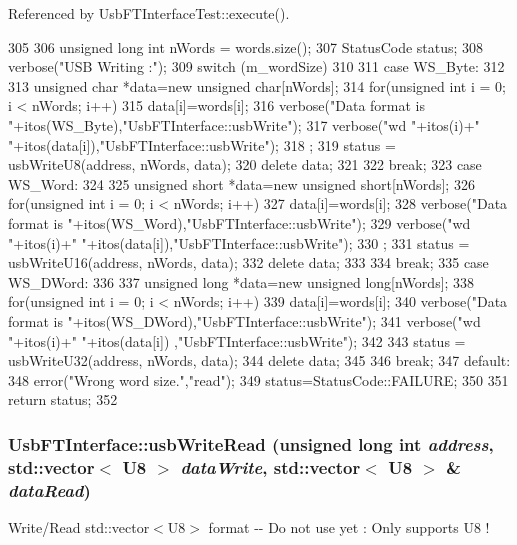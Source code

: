 Referenced by UsbFTInterfaceTest::execute().


\begin{DoxyCode}
305 {
306   unsigned long int nWords = words.size();
307   StatusCode status;
308   verbose("USB Writing :");
309   switch (m_wordSize)
310   {
311   case WS_Byte:
312     {
313       unsigned char *data=new unsigned char[nWords];
314       for(unsigned int i = 0; i < nWords; i++){
315         data[i]=words[i];
316         verbose("Data format is "+itos(WS_Byte),"UsbFTInterface::usbWrite");
317         verbose("wd "+itos(i)+" "+itos(data[i]),"UsbFTInterface::usbWrite");
318       };
319       status = usbWriteU8(address, nWords, data);
320       delete data;
321     }
322     break;
323   case WS_Word:
324     {
325       unsigned short *data=new unsigned short[nWords];
326       for(unsigned int i = 0; i < nWords; i++){
327         data[i]=words[i];
328         verbose("Data format is "+itos(WS_Word),"UsbFTInterface::usbWrite");
329         verbose("wd "+itos(i)+" "+itos(data[i]),"UsbFTInterface::usbWrite");
330       };
331       status = usbWriteU16(address, nWords, data);
332       delete data;
333     }
334     break;
335   case WS_DWord:
336     {
337       unsigned long *data=new unsigned long[nWords];
338       for(unsigned int i = 0; i < nWords; i++){
339         data[i]=words[i];
340         verbose("Data format is "+itos(WS_DWord),"UsbFTInterface::usbWrite");
341         verbose("wd "+itos(i)+" "+itos(data[i]) ,"UsbFTInterface::usbWrite");
342       }
343       status = usbWriteU32(address, nWords, data);
344       delete data;
345     }
346     break;
347   default:
348     error("Wrong word size.","read");
349     status=StatusCode::FAILURE;
350   }
351   return status;
352 }
\end{DoxyCode}
\hypertarget{classUsbFTInterface_aa477927996bd05aeee185c192ef9a68e}{
\subsubsection[{usbWriteRead}]{ UsbFTInterface::usbWriteRead (unsigned long int {\em address}, \/  std::vector$<$ {\bf U8} $>$ {\em dataWrite}, \/  std::vector$<$ {\bf U8} $>$ \& {\em dataRead})}}
\label{classUsbFTInterface_aa477927996bd05aeee185c192ef9a68e}
Write/Read std::vector$<$U8$>$ format -\/-\/ Do not use yet : Only supports U8 ! 

